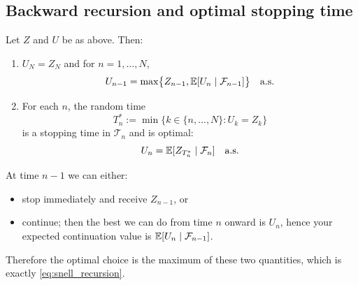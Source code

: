 \subsection{Backward recursion and optimal stopping time}

\begin{theorem}\label{thm:snell}
Let $Z$ and $U$ be as above. Then:
\begin{enumerate}[label=(\roman*)]
\item $U_N=Z_N$ and for $n=1,\dots,N$,
\begin{equation}\label{eq:snell_recursion}
U_{n-1}=\max\bigl\{ Z_{n-1}, \mathbb{E}[U_n\mid \mathcal{F}_{n-1}] \bigr\}\quad\text{a.s.}
\end{equation}
\item For each $n$, the random time
\[
T_n^\ast := \min\{k\in\{n,\dots,N\}: U_k=Z_k\}
\]
is a stopping time in $\mathcal{T}_n$ and is optimal:
\begin{equation}\label{eq:optimality}
U_n=\mathbb{E}[Z_{T_n^\ast}\mid \mathcal{F}_n]\quad\text{a.s.}
\end{equation}
\end{enumerate}
\end{theorem}

\begin{remark}
At time $n-1$ we can either:
\begin{itemize}
\item stop immediately and receive $Z_{n-1}$, or
\item continue; then the best we can do from time $n$ onward is $U_n$, hence your expected continuation
value is $\mathbb{E}[U_n\mid \mathcal{F}_{n-1}]$.
\end{itemize}
Therefore the optimal choice is the maximum of these two quantities, which is exactly
\eqref{eq:snell_recursion}.
\end{remark}

